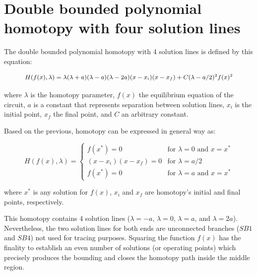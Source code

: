 \documentclass{elex}
\begin{document}
\section{Double bounded polynomial homotopy with four solution lines}

The double bounded polynomial homotopy with 4 solution lines  is defined by this equation:

\begin{equation}
{\small
\begin{array}{l}
H(f(x),\lambda )=\lambda(\lambda+a)(\lambda-a)(\lambda-2a)(x-x_i)(x-x_f) +C(\lambda-a/2)^2 f(x)^2
\end{array}}
\label{homotopiaP}
\end{equation}

where $\lambda$ is the homotopy parameter, $f(x)$ the equilibrium equation \cite{mnaxx} of the circuit, $a$ is a constant that represents separation between solution lines, $x_i$ is the initial point, $x_f$ the final point, and $C$ an arbitrary constant.

Based on the previous, homotopy can be expressed in general way as:

\begin{displaymath}
H(f(x),\lambda ) = \left\{\begin{array}{rl}
f(x^*)=0 & \textrm{for $\lambda=0$ and $x=x^*$}\\
(x-x_i)(x-x_f)=0 & \textrm{for $\lambda=a/2$}\\
f(x^*)=0 & \textrm{for $\lambda=a$ and $x=x^*$}
\end{array}\right.
\end{displaymath}

where $x^*$ is any solution for $f(x)$, $x_i$ and  $x_f$ are homotopy's initial and final points, respectively.

This homotopy contains 4 solution lines ($\lambda=-a$, $\lambda=0$, $\lambda=a$, and $\lambda=2a$). Nevertheless, the two solution lines for both ends are unconnected branches ($SB1$ and $SB4$) not used for tracing purposes. Squaring the function $f(x)$ has the finality to establish an even number of solutions (or operating points) which precisely produces the bounding and closes the homotopy path inside the middle region.
\end{document}

